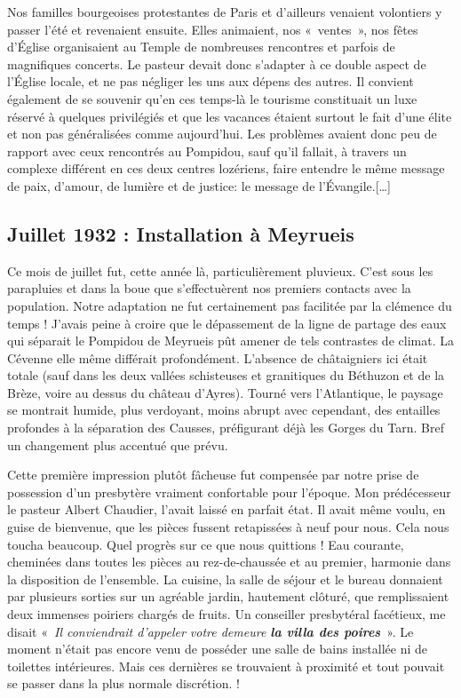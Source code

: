 Nos familles bourgeoises protestantes de Paris et d’ailleurs venaient volontiers y
passer l’été et revenaient ensuite. Elles animaient, nos «~ventes~», nos fêtes d’Église
organisaient au Temple de nombreuses rencontres et parfois de magnifiques concerts.
Le pasteur devait donc s’adapter à ce double aspect de l’Église locale, et ne pas
négliger les uns aux dépens des autres. Il convient également de se souvenir qu’en ces temps-là le tourisme constituait un luxe réservé à quelques privilégiés et que les
vacances étaient surtout le fait d’une élite et non pas généralisées comme aujourd’hui.
Les problèmes avaient donc peu de rapport avec ceux rencontrés au Pompidou, sauf
qu’il fallait, à travers un complexe différent en ces deux centres lozériens, faire
entendre le même message de paix, d’amour, de lumière et de justice: le message de
l’Évangile.[\ldots]

\subsection{Juillet 1932 : Installation à Meyrueis}

Ce mois de juillet fut, cette année là, particulièrement pluvieux. C’est sous les
parapluies et dans la boue que s’effectuèrent nos premiers contacts avec la
population. Notre adaptation ne fut certainement pas facilitée par la clémence du
temps ! J’avais peine à croire que le dépassement de la ligne de partage des eaux qui
séparait le Pompidou de Meyrueis pût amener de tels contrastes de climat. La
Cévenne elle même différait profondément. L’absence de châtaigniers ici était totale
(sauf dans les deux vallées schisteuses et granitiques du Béthuzon et de la Brèze, voire au dessus du
château d’Ayres). Tourné vers l’Atlantique, le paysage se montrait humide, plus
verdoyant, moins abrupt avec cependant, des entailles profondes à la séparation des
Causses, préfigurant déjà les Gorges du Tarn. Bref un changement plus accentué que
prévu.

Cette première impression plutôt fâcheuse fut compensée par notre prise de
possession d’un presbytère vraiment confortable pour l’époque.
Mon prédécesseur le pasteur Albert Chaudier, l’avait laissé en parfait état. Il avait
même voulu, en guise de bienvenue, que les pièces fussent retapissées à neuf pour
nous. Cela nous toucha beaucoup. Quel progrès sur ce que nous quittions ! Eau
courante, cheminées dans toutes les pièces au rez-de-chaussée et au premier,
harmonie dans la disposition de l’ensemble. La cuisine, la salle de séjour et le bureau
donnaient par plusieurs sorties sur un agréable jardin, hautement clôturé, que
remplissaient deux immenses poiriers chargés de fruits. Un conseiller presbytéral
facétieux, me disait «~\textit{Il conviendrait d’appeler votre demeure \textbf{la villa des poires}}~».
Le moment n’était pas encore venu de posséder une salle de bains installée ni de
toilettes intérieures. Mais ces dernières se trouvaient à proximité et tout pouvait se
passer dans la plus normale discrétion. !

